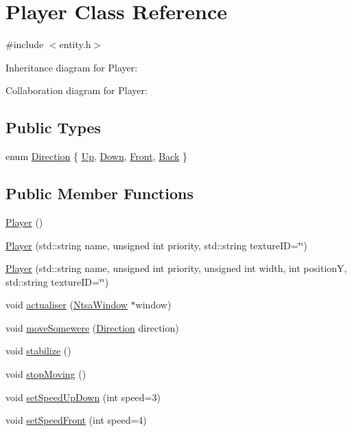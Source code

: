 \hypertarget{class_player}{\section{Player Class Reference}
\label{class_player}
}


{\ttfamily \#include $<$entity.\-h$>$}



Inheritance diagram for Player\-:


Collaboration diagram for Player\-:
\subsection*{Public Types}
\begin{DoxyCompactItemize}
\item 
enum \hyperlink{class_player_ad1b5932229b5d87c3dbca5bfcacb6936}{Direction} \{ \hyperlink{class_player_ad1b5932229b5d87c3dbca5bfcacb6936a086ad5e6686e1540d2e0a09ca9ffc624}{Up}, 
\hyperlink{class_player_ad1b5932229b5d87c3dbca5bfcacb6936af654e304331768c532162a09347a597f}{Down}, 
\hyperlink{class_player_ad1b5932229b5d87c3dbca5bfcacb6936a21686ef8708bbb74f922069e23f2f2cf}{Front}, 
\hyperlink{class_player_ad1b5932229b5d87c3dbca5bfcacb6936aa5ce1f24920b0fe17104ab08a9afb07a}{Back}
 \}
\end{DoxyCompactItemize}
\subsection*{Public Member Functions}
\begin{DoxyCompactItemize}
\item 
\hyperlink{class_player_affe0cc3cb714f6deb4e62f0c0d3f1fd8}{Player} ()
\item 
\hyperlink{class_player_a6ac29a86604739284bdc303e219c3d32}{Player} (std\-::string name, unsigned int priority, std\-::string texture\-I\-D=\char`\"{}\char`\"{})
\item 
\hyperlink{class_player_a660212a54bd654ac1762467e00a2da31}{Player} (std\-::string name, unsigned int priority, unsigned int width, int position\-Y, std\-::string texture\-I\-D=\char`\"{}\char`\"{})
\item 
void \hyperlink{class_player_a4297433163d2c6b6a82b5d71c5362466}{actualiser} (\hyperlink{class_ntsa_window}{Ntsa\-Window} $\ast$window)
\item 
void \hyperlink{class_player_a8710b5f12aafff7f5ae95e52775bdb04}{move\-Somewere} (\hyperlink{class_player_ad1b5932229b5d87c3dbca5bfcacb6936}{Direction} direction)
\item 
void \hyperlink{class_player_ab63c772d1598c64a7e4c4e34d33a52c5}{stabilize} ()
\item 
void \hyperlink{class_player_a478572d23809f9163fb6c9a3520f3dee}{stop\-Moving} ()
\item 
void \hyperlink{class_player_af8f3ac29d24141412375ddc872aa2e34}{set\-Speed\-Up\-Down} (int speed=3)
\item 
void \hyperlink{class_player_a34e0f244b1514104498166d6f2ce2906}{set\-Speed\-Front} (int speed=4)
\end{DoxyCompactItemize}
